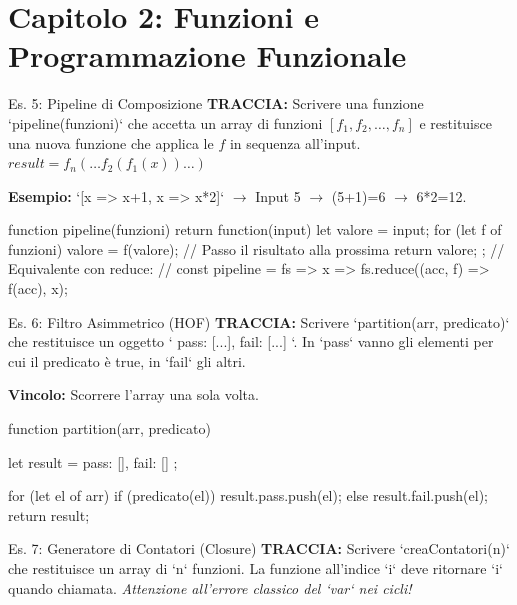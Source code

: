 \section{Capitolo 2: Funzioni e Programmazione Funzionale}

\begin{esercizio}{Es. 5: Pipeline di Composizione}
\textbf{TRACCIA:} Scrivere una funzione `pipeline(funzioni)` che accetta un array di funzioni $[f_1, f_2, \dots, f_n]$ e restituisce una nuova funzione che applica le $f$ in sequenza all'input.
$result = f_n(\dots f_2(f_1(x))\dots)$

\textbf{Esempio:} `[x => x+1, x => x*2]` $\to$ Input 5 $\to$ (5+1)=6 $\to$ 6*2=12.
\end{esercizio}

\begin{jsbox}
function pipeline(funzioni) {
    return function(input) {
        let valore = input;
        for (let f of funzioni) {
            valore = f(valore); // Passo il risultato alla prossima
        }
        return valore;
    };
}
// Equivalente con reduce:
// const pipeline = fs => x => fs.reduce((acc, f) => f(acc), x);
\end{jsbox}

\begin{esercizio}{Es. 6: Filtro Asimmetrico (HOF)}
\textbf{TRACCIA:} Scrivere `partition(arr, predicato)` che restituisce un oggetto `{ pass: [...], fail: [...] }`.
In `pass` vanno gli elementi per cui il predicato è true, in `fail` gli altri.

\textbf{Vincolo:} Scorrere l'array una sola volta.
\end{esercizio}

\begin{jsbox}
function partition(arr, predicato) {
    let result = { pass: [], fail: [] };
    
    for (let el of arr) {
        if (predicato(el)) {
            result.pass.push(el);
        } else {
            result.fail.push(el);
        }
    }
    return result;
}
\end{jsbox}

\begin{esercizio}{Es. 7: Generatore di Contatori (Closure)}
\textbf{TRACCIA:} Scrivere `creaContatori(n)` che restituisce un array di `n` funzioni.
La funzione all'indice `i` deve ritornare `i` quando chiamata.
\textit{Attenzione all'errore classico del `var` nei cicli!}
\end{esercizio}

